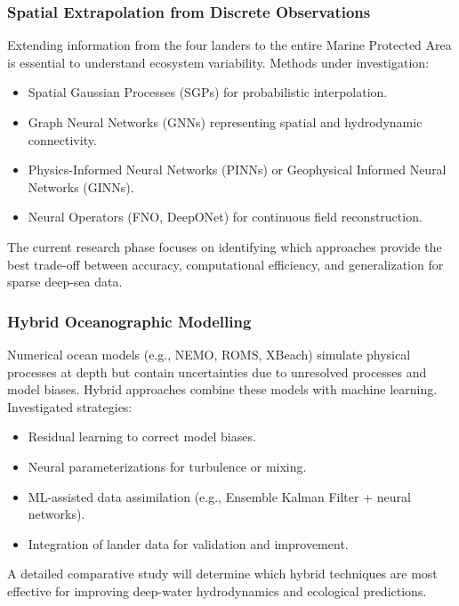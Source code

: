 \documentclass[12pt,a4paper]{article}
\begin{document}
\subsubsection{Spatial Extrapolation from Discrete Observations}
Extending information from the four landers to the entire Marine Protected Area is essential to understand ecosystem variability. Methods under investigation:
\begin{itemize}[noitemsep]
    \item Spatial Gaussian Processes (SGPs) for probabilistic interpolation.
    \item Graph Neural Networks (GNNs) representing spatial and hydrodynamic connectivity.
    \item Physics-Informed Neural Networks (PINNs) or Geophysical Informed Neural Networks (GINNs).
    \item Neural Operators (FNO, DeepONet) for continuous field reconstruction.
\end{itemize}
The current research phase focuses on identifying which approaches provide the best trade-off between accuracy, computational efficiency, and generalization for sparse deep-sea data.

\subsubsection{Hybrid Oceanographic Modelling}
Numerical ocean models (e.g., NEMO, ROMS, XBeach) simulate physical processes at depth but contain uncertainties due to unresolved processes and model biases. Hybrid approaches combine these models with machine learning. Investigated strategies:
\begin{itemize}[noitemsep]
    \item Residual learning to correct model biases.
    \item Neural parameterizations for turbulence or mixing.
    \item ML-assisted data assimilation (e.g., Ensemble Kalman Filter + neural networks).
    \item Integration of lander data for validation and improvement.
\end{itemize}
A detailed comparative study will determine which hybrid techniques are most effective for improving deep-water hydrodynamics and ecological predictions.
\end{document}
